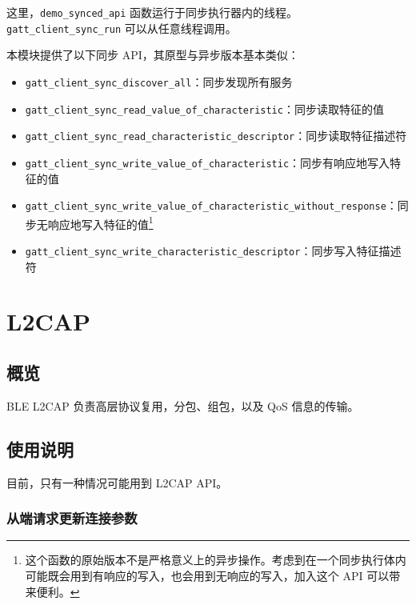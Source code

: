 \documentclass[
  12pt,
]{book}
\begin{document}
这里，\texttt{demo\_synced\_api} 函数运行于同步执行器内的线程。\texttt{gatt\_client\_sync\_run} 可以从任意线程调用。

本模块提供了以下同步 API，其原型与异步版本基本类似：

\begin{itemize}
\item
  \texttt{gatt\_client\_sync\_discover\_all}：同步发现所有服务
\item
  \texttt{gatt\_client\_sync\_read\_value\_of\_characteristic}：同步读取特征的值
\item
  \texttt{gatt\_client\_sync\_read\_characteristic\_descriptor}：同步读取特征描述符
\item
  \texttt{gatt\_client\_sync\_write\_value\_of\_characteristic}：同步有响应地写入特征的值
\item
  \texttt{gatt\_client\_sync\_write\_value\_of\_characteristic\_without\_response}：同步无响应地写入特征的值\footnote{这个函数的原始版本不是严格意义上的异步操作。考虑到在一个同步执行体内可能既会用到有响应的写入，也会用到无响应的写入，加入这个 API 可以带来便利。}
\item
  \texttt{gatt\_client\_sync\_write\_characteristic\_descriptor}：同步写入特征描述符
\end{itemize}

\hypertarget{ch-l2cap}{%
\chapter{L2CAP}\label{ch-l2cap}}

\hypertarget{ux6982ux89c8-5}{%
\section{概览}\label{ux6982ux89c8-5}}

BLE L2CAP 负责高层协议复用，分包、组包，以及 QoS 信息的传输。

\hypertarget{ux4f7fux7528ux8bf4ux660e-5}{%
\section{使用说明}\label{ux4f7fux7528ux8bf4ux660e-5}}

目前，只有一种情况可能用到 L2CAP API。

\hypertarget{ux4eceux7aefux8bf7ux6c42ux66f4ux65b0ux8fdeux63a5ux53c2ux6570}{%
\subsection{从端请求更新连接参数}\label{ux4eceux7aefux8bf7ux6c42ux66f4ux65b0ux8fdeux63a5ux53c2ux6570}}
\end{document}
